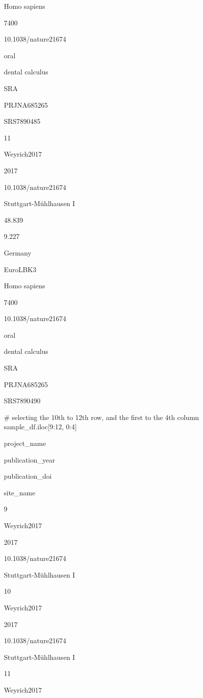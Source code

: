 \documentclass[
  letterpaper,
]{book}
\newenvironment{Shaded}{}{}
\newcommand{\CommentTok}[1]{\textcolor[rgb]{0.42,0.45,0.49}{#1}}
\newcommand{\DecValTok}[1]{\textcolor[rgb]{0.00,0.36,0.77}{#1}}
\newcommand{\NormalTok}[1]{\textcolor[rgb]{0.14,0.16,0.18}{#1}}
\begin{document}
Homo sapiens

7400

10.1038/nature21674

oral

dental calculus

SRA

PRJNA685265

SRS7890485

11

Weyrich2017

2017

10.1038/nature21674

Stuttgart-Mühlhausen I

48.839

9.227

Germany

EuroLBK3

Homo sapiens

7400

10.1038/nature21674

oral

dental calculus

SRA

PRJNA685265

SRS7890490

\begin{Shaded}
\begin{Highlighting}[]
\CommentTok{\# selecting the 10th to 12th row, and the first to the 4th column}
\NormalTok{sample\_df.iloc[}\DecValTok{9}\NormalTok{:}\DecValTok{12}\NormalTok{, }\DecValTok{0}\NormalTok{:}\DecValTok{4}\NormalTok{]}
\end{Highlighting}
\end{Shaded}

project\_name

publication\_year

publication\_doi

site\_name

9

Weyrich2017

2017

10.1038/nature21674

Stuttgart-Mühlhausen I

10

Weyrich2017

2017

10.1038/nature21674

Stuttgart-Mühlhausen I

11

Weyrich2017
\end{document}
